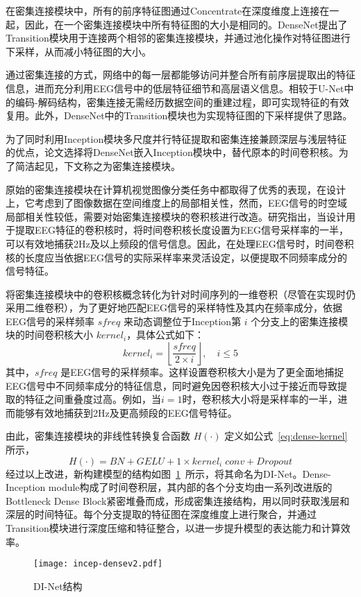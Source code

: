在密集连接模块中，所有的前序特征图通过Concentrate在深度维度上连接在一起，因此，在一个密集连接模块中所有特征图的大小是相同的。DenseNet提出了Transition模块用于连接两个相邻的密集连接模块，并通过池化操作对特征图进行下采样，从而减小特征图的大小。

通过密集连接的方式，网络中的每一层都能够访问并整合所有前序层提取出的特征信息，进而充分利用EEG信号中的低层特征细节和高层语义信息。相较于U-Net中的编码-解码结构，密集连接无需经历数据空间的重建过程，即可实现特征的有效复用。此外，DenseNet中的Transition模块也为实现特征图的下采样提供了思路。

为了同时利用Inception模块多尺度并行特征提取和密集连接兼顾深层与浅层特征的优点，论文选择将DenseNet嵌入Inception模块中，替代原本的时间卷积核。为了简洁起见，下文称之为密集连接模块。

原始的密集连接模块在计算机视觉图像分类任务中都取得了优秀的表现，在设计上，它考虑到了图像数据在空间维度上的局部相关性，然而，EEG信号的时空域局部相关性较低，需要对始密集连接模块的卷积核进行改造。研究指出\cite{lawhern2018eegnet}，当设计用于提取EEG特征的卷积核时，将时间卷积核长度设置为EEG信号采样率的一半，可以有效地捕获2Hz及以上频段的信号信息。因此，在处理EEG信号时，时间卷积核的长度应当依据EEG信号的实际采样率来灵活设定，以便提取不同频率成分的信号特征。

将密集连接模块中的卷积核概念转化为针对时间序列的一维卷积（尽管在实现时仍采用二维卷积），为了更好地匹配EEG信号的采样特性及其内在频率成分，依据EEG信号的采样频率 \(sfreq\) 来动态调整位于Inception第 \(i\) 个分支上的密集连接模块的时间卷积核大小 \(kernel_i\)，具体公式如下：
\begin{equation}
    kernel_i = \left \lfloor \frac{sfreq}{2 \times i} \right \rfloor , \quad i \le 5
    \label{eq:kernel_cal}
\end{equation}
其中，\(sfreq\) 是EEG信号的采样频率。这样设置卷积核大小是为了更全面地捕捉EEG信号中不同频率成分的特征信息，同时避免因卷积核大小过于接近而导致提取的特征之间重叠度过高。例如，当\(i=1\)时，卷积核大小将是采样率的一半，进而能够有效地捕获到2Hz及更高频段的EEG信号特征。

由此，密集连接模块的非线性转换复合函数 \(H(·)\) 定义如公式~\ref{eq:dense-kernel}所示，
\begin{equation}\label{eq:dense-kernel}
    H(·) = BN + GELU + 1 \times kernel_i\;conv + Dropout 
\end{equation}
经过以上改进，新构建模型的结构如图~\ref{fig:incep-dense}~所示，将其命名为DI-Net。Dense-Inception module构成了时间卷积层，其内部的各个分支均由一系列改进版的Bottleneck Dense Block紧密堆叠而成，形成密集连接结构，用以同时获取浅层和深层的时间特征。每个分支提取的特征图在深度维度上进行聚合，并通过Transition模块进行深度压缩和特征整合，以进一步提升模型的表达能力和计算效率。
\begin{figure}
  \centering
  \texttt{[image: incep-densev2.pdf]}
  \caption{DI-Net结构}
  \label{fig:incep-dense}
\end{figure}

